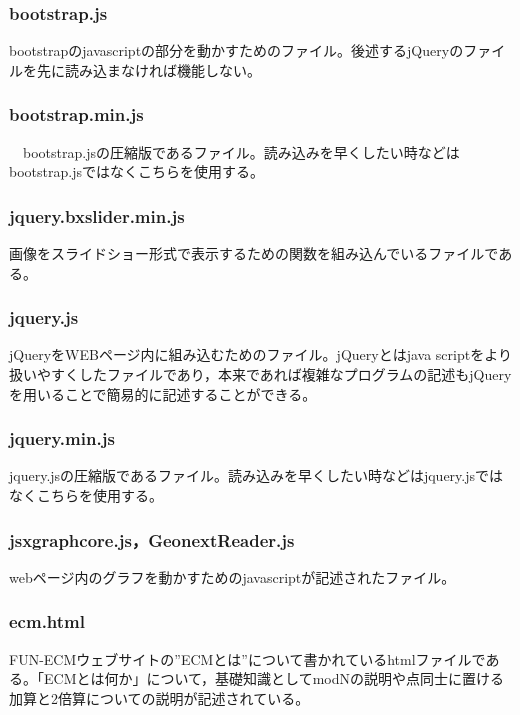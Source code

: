 \documentclass[openany,11pt,papersize]{jsbook}
\begin{document}
\subsubsection{bootstrap.js}
bootstrapのjavascriptの部分を動かすためのファイル。後述するjQueryのファイルを先に読み込まなければ機能しない。

\subsubsection{bootstrap.min.js}
　bootstrap.jsの圧縮版であるファイル。読み込みを早くしたい時などはbootstrap.jsではなくこちらを使用する。

\subsubsection{jquery.bxslider.min.js}
画像をスライドショー形式で表示するための関数を組み込んでいるファイルである。

\subsubsection{jquery.js}
jQueryをWEBページ内に組み込むためのファイル。jQueryとはjava scriptをより扱いやすくしたファイルであり，本来であれば複雑なプログラムの記述もjQueryを用いることで簡易的に記述することができる。

\subsubsection{jquery.min.js}
jquery.jsの圧縮版であるファイル。読み込みを早くしたい時などはjquery.jsではなくこちらを使用する。

\subsubsection{jsxgraphcore.js，GeonextReader.js}
webページ内のグラフを動かすためのjavascriptが記述されたファイル。

\subsubsection{ecm.html}
FUN-ECMウェブサイトの”ECMとは”について書かれているhtmlファイルである。「ECMとは何か」について，基礎知識としてmodNの説明や点同士に置ける加算と2倍算についての説明が記述されている。
\end{document}
